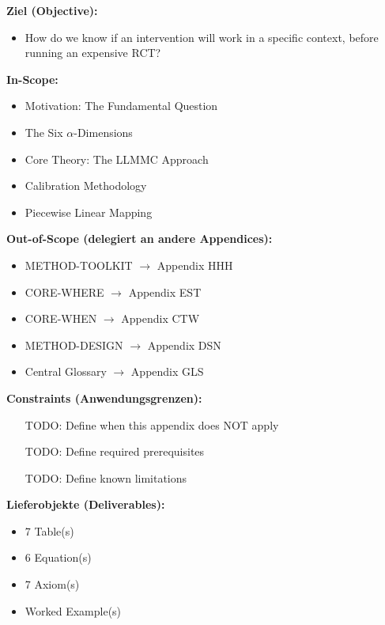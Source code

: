 \begin{tcolorbox}[
    colback=orange!5!white,
    colframe=orange!75!black,
    title={\textbf{Appendix Scope: Ziel / In-Scope / Out-of-Scope / Constraints}},
    fonttitle=\bfseries
]

\textbf{Ziel (Objective):}
\begin{itemize}[nosep]
    \item How do we know if an intervention will work in a specific context,
before running an expensive RCT?
\end{itemize}

\textbf{In-Scope:}
\begin{itemize}[nosep]
    \item Motivation: The Fundamental Question
    \item The Six $\alpha$-Dimensions
    \item Core Theory: The LLMMC Approach
    \item Calibration Methodology
    \item Piecewise Linear Mapping
\end{itemize}

\textbf{Out-of-Scope (delegiert an andere Appendices):}
\begin{itemize}[nosep]
    \item METHOD-TOOLKIT $\rightarrow$ Appendix HHH
    \item CORE-WHERE $\rightarrow$ Appendix EST
    \item CORE-WHEN $\rightarrow$ Appendix CTW
    \item METHOD-DESIGN $\rightarrow$ Appendix DSN
    \item Central Glossary $\rightarrow$ Appendix GLS
\end{itemize}

\textbf{Constraints (Anwendungsgrenzen):}
\begin{itemize}[nosep]
    \item [TODO: Define when this appendix does NOT apply]
    \item [TODO: Define required prerequisites]
    \item [TODO: Define known limitations]
\end{itemize}

\textbf{Lieferobjekte (Deliverables):}
\begin{itemize}[nosep]
    \item 7 Table(s)
    \item 6 Equation(s)
    \item 7 Axiom(s)
    \item Worked Example(s)
\end{itemize}

\end{tcolorbox}


